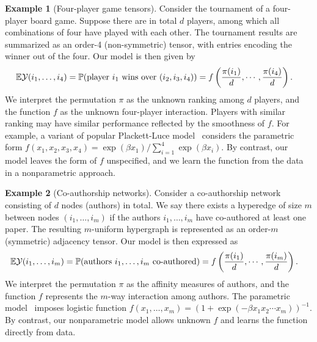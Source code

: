 \documentclass[12pt]{article}
\theoremstyle{definition}
\newtheorem{example}{Example}
\begin{document}
\begin{example}[Four-player game tensors] Consider the tournament of a four-player board game. Suppose there are in total $d$ players, among which all combinations of four have played with each other. The tournament results are summarized as an order-4 (non-symmetric) tensor, with entries encoding the winner out of the four. Our model is then given by
\begin{align}
\mathbb{E}\mathcal{Y}(i_1,\ldots,i_4)&=\mathbb{P}(\text{player $i_1$ wins over $(i_2,i_3,i_4)$})
=f\left({\pi(i_1)\over d},\cdots, {\pi(i_4)\over d}\right).
\end{align}
We interpret the permutation $\pi$ as the unknown ranking among $d$ players, and the function $f$ as the unknown four-player interaction. Players with similar ranking may have similar performance reflected by the smoothness of $f$. For example, a variant of popular Plackett-Luce model~\cite{chen2022optimal} considers the parametric form $f(x_1,x_2,x_3,x_4)={\exp(\beta x_1)/ \sum_{i=1}^4\exp(\beta x_i)}$. By contrast, our model leaves the form of $f$ unspecified, and we learn the function from the data in a nonparametric approach. 
\end{example}

\begin{example}[Co-authorship networks] Consider a co-authorship network consisting of $d$ nodes (authors) in total. We say there exists a hyperedge of size $m$ between nodes $(i_1,\ldots,i_m)$ if the authors $i_1,\ldots,i_m$ have co-authored at least one paper. The resulting $m$-uniform hypergraph is represented as an order-$m$ (symmetric) adjacency tensor. Our model is then expressed as
\begin{align}
    \mathbb{E}\mathcal{Y}(i_1,\ldots,i_m)&=\mathbb{P}(\text{authors $i_1,\ldots,i_m$ co-authored})
=f\left({\pi(i_1)\over d},\cdots, {\pi(i_m)\over d}\right).
\end{align}
We interpret the permutation $\pi$ as the affinity measures of authors, and the function $f$ represents the $m$-way interaction among authors. The parametric model~\cite{wang2018learning} imposes logistic function $f(x_1,\ldots,x_m)=(1+\exp(-\beta x_1x_2\cdots x_m))^{-1}$. By contrast, our nonparametric model allows unknown $f$ and learns the function directly from data. 
\end{example}
\end{document}
